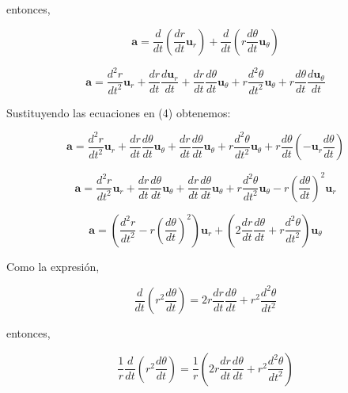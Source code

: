 \documentclass{article}
\begin{document}
\begin{itemize}
	entonces, 
	
	\begin{equation*}
		\mathbf{a} = \frac{d}{dt} \left(\frac{dr}{dt} \mathbf{u}_r \right) + \frac{d}{dt} \left(r \frac{d \theta}{dt} \mathbf{u}_\theta \right)
	\end{equation*}
	
	
	\begin{equation*}
		\mathbf{a} = \frac{d^2r}{dt^2} \mathbf{u}_r + \frac{dr}{dt} \frac{d \mathbf{u}_r}{dt}  + \frac{dr}{dt} \frac{d \theta}{dt} \mathbf{u}_\theta + r \frac{d^2\theta}{dt^2} \mathbf{u}_\theta + r \frac{d \theta}{dt} \frac{d \mathbf{u}_\theta}{dt}
	\end{equation*}
	
	Sustituyendo las ecuaciones en (4) obtenemos:
	
	\begin{equation*}
		\mathbf{a} = \frac{d^2r}{dt^2} \mathbf{u}_r + \frac{dr}{dt} \frac{d \theta}{dt} \mathbf{u}_\theta + \frac{dr}{dt} \frac{d \theta}{dt} \mathbf{u}_\theta + r \frac{d^2\theta}{dt^2} \mathbf{u}_\theta + r \frac{d \theta}{dt} \left( -\mathbf{u}_r \frac{d \theta}{dt} \right)
	\end{equation*}
	
	\begin{equation*}
		\mathbf{a} = \frac{d^2r}{dt^2} \mathbf{u}_r + \frac{dr}{dt} \frac{d \theta}{dt} \mathbf{u}_\theta + \frac{dr}{dt} \frac{d \theta}{dt} \mathbf{u}_\theta +  r \frac{d^2\theta}{dt^2} \mathbf{u}_\theta - r \left(\frac{d \theta}{dt} \right)^2 \mathbf{u}_r
	\end{equation*}
	
	\begin{equation*}
		\mathbf{a} = \left(\frac{d^2r}{dt^2} - r \left(\frac{d \theta}{dt} \right)^2 \right) \mathbf{u}_r + \left(2 \frac{dr}{dt} \frac{d \theta}{dt} + r \frac{d^2\theta}{dt^2} \right) \mathbf{u}_\theta  \tag{6'}
	\end{equation*}
	
	Como la expresión,
	
	\begin{equation*}
		\frac{d}{dt} \left(r^2 \frac{d \theta}{dt} \right) = 2r \frac{dr}{dt} \frac{d \theta}{dt} + r^2 \frac{d^2\theta}{dt^2}
	\end{equation*}
	
	entonces,
	
	\begin{equation*}
		\frac{1}{r} \frac{d}{dt} \left(r^2 \frac{d \theta}{dt} \right) = \frac{1}{r} \left(2r \frac{dr}{dt} \frac{d \theta}{dt} + r^2 \frac{d^2\theta}{dt^2} \right)
	\end{equation*}
	

\end{itemize}
\end{document}
